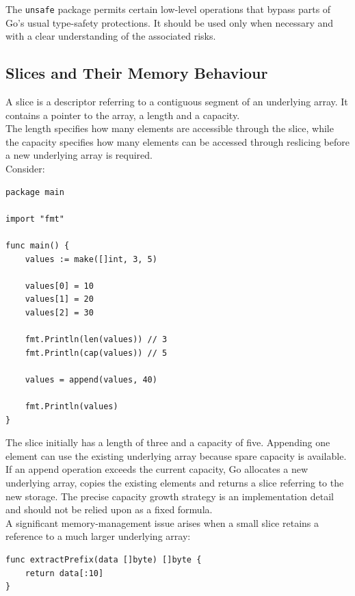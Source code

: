 The \texttt{unsafe} package permits certain low-level operations that bypass parts of Go's usual type-safety protections. It should be used only when necessary and with a clear understanding of the associated risks.\\

\subsection{Slices and Their Memory Behaviour}

A slice is a descriptor referring to a contiguous segment of an underlying array. It contains a pointer to the array, a length and a capacity.\\

The length specifies how many elements are accessible through the slice, while the capacity specifies how many elements can be accessed through reslicing before a new underlying array is required.\\

Consider:

\begin{lstlisting}
package main

import "fmt"

func main() {
    values := make([]int, 3, 5)

    values[0] = 10
    values[1] = 20
    values[2] = 30

    fmt.Println(len(values)) // 3
    fmt.Println(cap(values)) // 5

    values = append(values, 40)

    fmt.Println(values)
}
\end{lstlisting}

The slice initially has a length of three and a capacity of five. Appending one element can use the existing underlying array because spare capacity is available.\\

If an append operation exceeds the current capacity, Go allocates a new underlying array, copies the existing elements and returns a slice referring to the new storage. The precise capacity growth strategy is an implementation detail and should not be relied upon as a fixed formula.\\

A significant memory-management issue arises when a small slice retains a reference to a much larger underlying array:

\begin{lstlisting}
func extractPrefix(data []byte) []byte {
    return data[:10]
}
\end{lstlisting}

